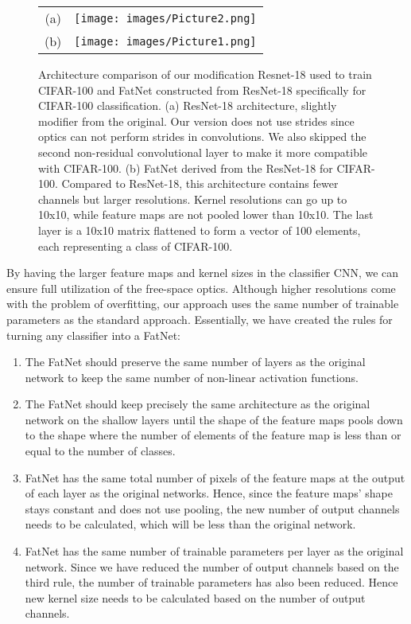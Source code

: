 \documentclass{article}
\begin{document}
\begin{figure}[H]
    \centering
    \begin{tabular}{cc}
    (a)     &          \texttt{[image: images/Picture2.png]}\\
    (b)     &         \texttt{[image: images/Picture1.png]}
    \end{tabular}
    \caption{Architecture comparison of our modification Resnet-18 used to train CIFAR-100 and FatNet constructed from ResNet-18 specifically for CIFAR-100 classification. (a) ResNet-18 architecture, slightly modifier from the original. Our version does not use strides since optics can not perform strides in convolutions. We also skipped the second non-residual convolutional layer to make it more compatible with CIFAR-100. (b) FatNet derived from the ResNet-18 for CIFAR-100. Compared to ResNet-18, this architecture contains fewer channels but larger resolutions. Kernel resolutions can go up to 10x10, while feature maps are not pooled lower than 10x10. The last layer is a 10x10 matrix flattened to form a vector of 100 elements, each representing a class of CIFAR-100.\label{fig:architecture}}
\end{figure}  

By having the larger feature maps and kernel sizes in the classifier CNN, we can ensure full utilization of the free-space optics. Although higher resolutions come with the problem of overfitting, our approach uses the same number of trainable parameters as the standard approach. Essentially, we have created the rules for turning any classifier into a FatNet:

\begin{enumerate}
\item The FatNet should preserve the same number of layers as the original network to keep the same number of non-linear activation functions.
\item The FatNet should keep precisely the same architecture as the original network on the shallow layers until the shape of the feature maps pools down to the shape where the number of elements of the feature map is less than or equal to the number of classes. 
\item FatNet has the same total number of pixels of the feature maps at the output of each layer as the original networks. Hence, since the feature maps' shape stays constant and does not use pooling, the new number of output channels needs to be calculated, which will be less than the original network.
\item FatNet has the same number of trainable parameters per layer as the original network. Since we have reduced the number of output channels based on the third rule, the number of trainable parameters has also been reduced. Hence new kernel size needs to be calculated based on the number of output channels. 
\end{enumerate}
\end{document}
